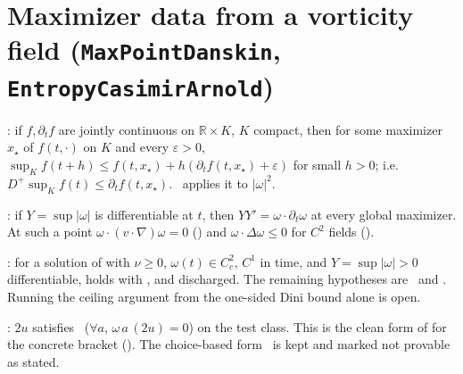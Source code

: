 \documentclass[11pt]{article}
\begin{document}
\section{Maximizer data from a vorticity field (\texttt{MaxPointDanskin}, \texttt{EntropyCasimirArnold})}
\begin{theorem}\coined: if $f,\partial_t f$ are jointly continuous on $\mathbb{R}\times K$, $K$ compact, then for some maximizer $x_\star$ of $f(t,\cdot)$ on $K$ and every $\varepsilon>0$, $\sup_K f(t+h)\le f(t,x_\star)+h(\partial_t f(t,x_\star)+\varepsilon)$ for small $h>0$; i.e.\ $D^+\sup_K f(t)\le\partial_t f(t,x_\star)$. \coined\ applies it to $|\omega|^2$.\end{theorem}
\begin{theorem}\coined: if $Y=\sup|\omega|$ is differentiable at $t$, then $YY'=\omega\cdot\partial_t\omega$ at every global maximizer. At such a point $\omega\cdot(v\cdot\nabla)\omega=0$ (\coined) and $\omega\cdot\Delta\omega\le0$ for $C^2$ fields (\coined).\end{theorem}
\begin{theorem}\coined: for a solution of  with $\nu\ge0$, $\omega(t)\in C^2_c$, $C^1$ in time, and $Y=\sup|\omega|>0$ differentiable,  holds with ,  and  discharged. The remaining hypotheses are \coined\ and \coined. Running the ceiling argument from the one-sided Dini bound alone is open.\end{theorem}
\begin{theorem}\coined: $2u$ satisfies \coined\ ($\forall a$,  $\omega\,a\,(2u)=0$) on the test class. This is the clean form of  for the concrete bracket (\coined). The choice-based form \coined\ is kept and marked not provable as stated.\end{theorem}
\end{document}
